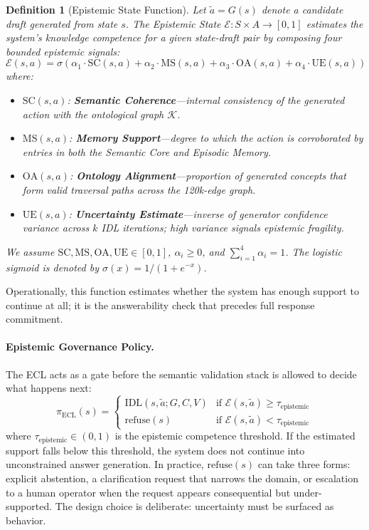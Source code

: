 \documentclass[11pt,a4paper]{article}
\newtheorem{definition}{Definition}
\begin{document}
\begin{definition}[Epistemic State Function]
\label{def:epistemic}
Let $\tilde{a}=G(s)$ denote a candidate draft generated from state $s$. The Epistemic State $\mathcal{E}: S \times A \rightarrow [0,1]$ estimates the system's knowledge competence for a given state-draft pair by composing four bounded epistemic signals:
\begin{equation}
  \mathcal{E}(s,a) = \sigma\!\left( \alpha_1 \cdot \text{SC}(s,a) + \alpha_2 \cdot \text{MS}(s,a) + \alpha_3 \cdot \text{OA}(s,a) + \alpha_4 \cdot \text{UE}(s,a) \right)
  \label{eq:epistemic}
\end{equation}
where:
\begin{itemize}
  \item $\text{SC}(s,a)$: \textbf{Semantic Coherence}---internal consistency of the generated action with the ontological graph $\mathcal{K}$.
  \item $\text{MS}(s,a)$: \textbf{Memory Support}---degree to which the action is corroborated by entries in both the Semantic Core and Episodic Memory.
  \item $\text{OA}(s,a)$: \textbf{Ontology Alignment}---proportion of generated concepts that form valid traversal paths across the 120k-edge graph.
  \item $\text{UE}(s,a)$: \textbf{Uncertainty Estimate}---inverse of generator confidence variance across $k$ IDL iterations; high variance signals epistemic fragility.
\end{itemize}
We assume $\text{SC},\text{MS},\text{OA},\text{UE}\in[0,1]$, $\alpha_i\geq 0$, and $\sum_{i=1}^{4}\alpha_i=1$. The logistic sigmoid is denoted by $\sigma(x)=1/(1+e^{-x})$.
\end{definition}
Operationally, this function estimates whether the system has enough support to continue at all; it is the answerability check that precedes full response commitment.

\paragraph{Epistemic Governance Policy.}
The ECL acts as a gate before the semantic validation stack is allowed to decide what happens next:
\begin{equation}
  \pi_{\text{ECL}}(s) = \begin{cases}
    \text{IDL}(s,\tilde{a};G,C,V) & \text{if } \mathcal{E}(s,\tilde{a}) \geq \tau_{\text{epistemic}} \\
    \text{refuse}(s) & \text{if } \mathcal{E}(s,\tilde{a}) < \tau_{\text{epistemic}}
  \end{cases}
  \label{eq:ecl_policy}
\end{equation}
where $\tau_{\text{epistemic}} \in (0,1)$ is the epistemic competence threshold. If the estimated support falls below this threshold, the system does not continue into unconstrained answer generation. In practice, $\text{refuse}(s)$ can take three forms: explicit abstention, a clarification request that narrows the domain, or escalation to a human operator when the request appears consequential but under-supported. The design choice is deliberate: uncertainty must be surfaced as behavior.
\end{document}
